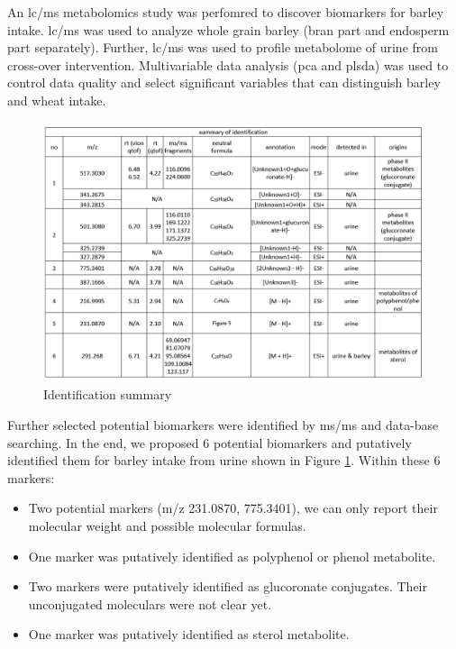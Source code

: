 An \acrshort{lc/ms} metabolomics study was perfomred to discover biomarkers for barley intake. 
\acrshort{lc/ms} was used to analyze whole grain barley (bran part and endosperm part separately). 
Further, \acrshort{lc/ms} was used to profile metabolome of urine from cross-over intervention. Multivariable data analysis (\acrshort{pca} and \acrshort{plsda}) was used to control data quality and select significant variables that can distinguish barley and wheat intake.

\begin{figure}[H]
    \centering
    \includegraphics[scale=0.42]{images/idsummarybarley.PNG}
    \caption{Identification summary}
    \label{fig:idsummary}
\end{figure}


Further selected potential biomarkers were identified by \acrshort{ms/ms} and data-base searching. In the end, we proposed 6 potential biomarkers and putatively identified them for barley intake from urine shown in Figure \ref{fig:idsummary}. Within these 6 markers:
\begin{itemize}
    \item Two potential markers (m/z 231.0870, 775.3401), we can only report their molecular weight and possible molecular formulas.
    \item One marker was putatively identified as polyphenol or phenol metabolite.
    \item Two markers were putatively identified as glucoronate conjugates. Their unconjugated moleculars were not clear yet.
    \item One marker was putatively identified as sterol metabolite.
\end{itemize}

